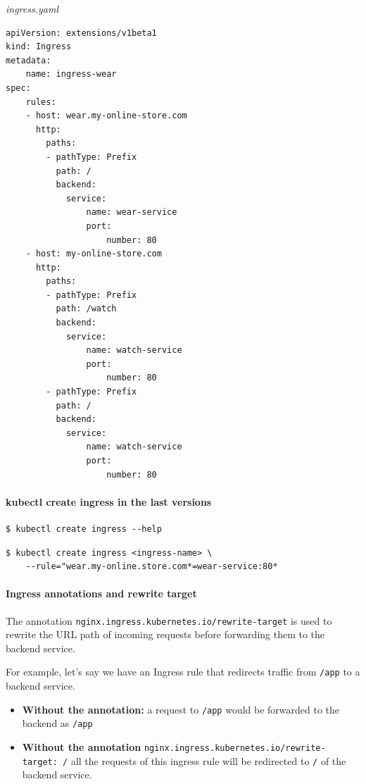 \documentclass{article}
\newenvironment{codetemplate}[1][]{%
  \mybasecolorbox[#1]
  \itshape
}{%
  \endmybasecolorbox
}
\begin{document}
\begin{codetemplate}{ingress.yaml}
\begin{verbatim}
apiVersion: extensions/v1beta1
kind: Ingress
metadata:
    name: ingress-wear
spec:
    rules:
    - host: wear.my-online-store.com
      http:
        paths:
        - pathType: Prefix
          path: /
          backend:
            service:
                name: wear-service
                port:
                    number: 80
    - host: my-online-store.com
      http: 
        paths:
        - pathType: Prefix
          path: /watch
          backend:
            service:
                name: watch-service
                port:
                    number: 80
        - pathType: Prefix
          path: /
          backend:
            service:
                name: watch-service
                port:
                    number: 80
\end{verbatim}
\end{codetemplate}

\paragraph{kubectl create ingress in the last versions}

\begin{codetemplate}{}
\begin{verbatim}
$ kubectl create ingress --help
\end{verbatim}
\end{codetemplate}

\begin{codetemplate}{}
\begin{verbatim}
$ kubectl create ingress <ingress-name> \
    --rule="wear.my-online.store.com*=wear-service:80*
\end{verbatim}
\end{codetemplate}

\paragraph{Ingress annotations and rewrite target}
The annotation \verb|nginx.ingress.kubernetes.io/rewrite-target| is used to rewrite the URL path of incoming requests before forwarding them to the backend service.

For example, let's say we have an Ingress rule that redirects traffic from \verb|/app| to a backend service. 

\begin{itemize}
    \item \textbf{Without the annotation:} a request to \verb|/app| would be forwarded to the backend as \verb|/app|
    \item \textbf{Without the annotation} \verb|nginx.ingress.kubernetes.io/rewrite-target: /| all the requests of this ingress rule will be redirected to \verb|/| of the backend service.
\end{itemize}
\end{document}
